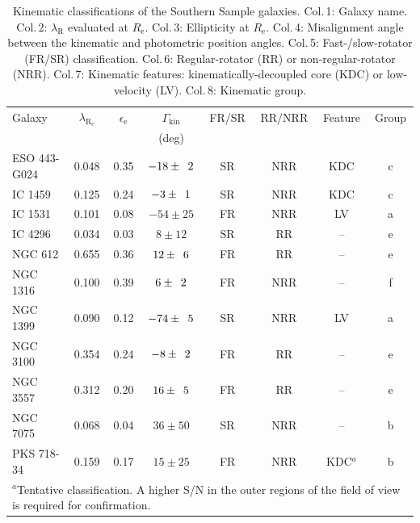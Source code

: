\documentclass[a4paper,fleqn,usenatbib]{mnras}
\begin{document}
	\begin{table}
		\centering
		\caption{Kinematic classifications of the Southern Sample galaxies. Col.\,1: Galaxy name. Col.\,2: $\lambda_\text{R}$ evaluated at $R_\text{e}$. Col.\,3: Ellipticity at $R_\text{e}$. Col.\,4: Misalignment angle between the kinematic and photometric position angles. Col.\,5: Fast-/slow-rotator (FR/SR) classification. Col.\,6: Regular-rotator (RR) or non-regular-rotator (NRR). Col.\,7: Kinematic features: kinematically-decoupled core (KDC) or low-velocity (LV). Col.\,8: Kinematic group.}
		\label{tab:classify}
		\begin{tabular}{l c c c c c c c}
			\hline
			\hline
			Galaxy		& $\lambda_\mathrm{R_e}$ & $\epsilon_\text{e}$  & $\Gamma_\text{kin}$ & FR/SR 	& RR/NRR 	& Feature & Group 	\\
			 & & & (deg) \\
			\hline 
			ESO 443-G024 & 0.048 & 0.35 & $-18\pm\leavevmode\phantom{0}2$	& SR & NRR & KDC & c \\
			IC 1459 	& 0.125 & 0.24 & \leavevmode\phantom{0}$-3\pm\leavevmode\phantom{0}1$ & SR & NRR & KDC & c \\
			IC 1531 	& 0.101 & 0.08 & $-54\pm25$	& FR & NRR & LV & a \\
			IC 4296		& 0.034 & 0.03 & \leavevmode\phantom{$-0$}$8\pm12$ & SR &\leavevmode\phantom{N}RR & -- & e \\
			NGC 612 	& 0.655 & 0.36 & \leavevmode\phantom{$-$}$12\pm\leavevmode\phantom{0}6$	& FR &\leavevmode\phantom{N}RR & -- & e \\
			NGC 1316 	& 0.100 & 0.39 & \leavevmode\phantom{$-0$}$6\pm\leavevmode\phantom{0}2$ & FR & NRR & -- & f \\
			NGC 1399 	& 0.090 & 0.12 & $-74\pm\leavevmode\phantom{0}5$ & SR & NRR & LV & a \\
			NGC 3100 	& 0.354 & 0.24 & \leavevmode\phantom{0}$-8\pm\leavevmode\phantom{0}2$ & FR &\leavevmode\phantom{N}RR & -- & e \\
			NGC 3557 	& 0.312 & 0.20 & \leavevmode\phantom{$-$}$16\pm\leavevmode\phantom{0}5$ & FR &\leavevmode\phantom{N}RR & -- & e\\
			NGC 7075 	& 0.068 & 0.04 & \leavevmode\phantom{$-$}$36\pm50$ & SR & NRR & -- & b \\
			PKS 718-34  & 0.159 & 0.17 & \leavevmode\phantom{$-$}$15\pm25$ & FR & NRR & KDC$^{a}$ & b\\
			\hline
			\hline
			\multicolumn{8}{L{.7\linewidth}}{$^{a}$Tentative classification. A higher S/N in the outer regions of the field of view is required for confirmation.}


\end{tabular}
\end{table}
\end{document}
